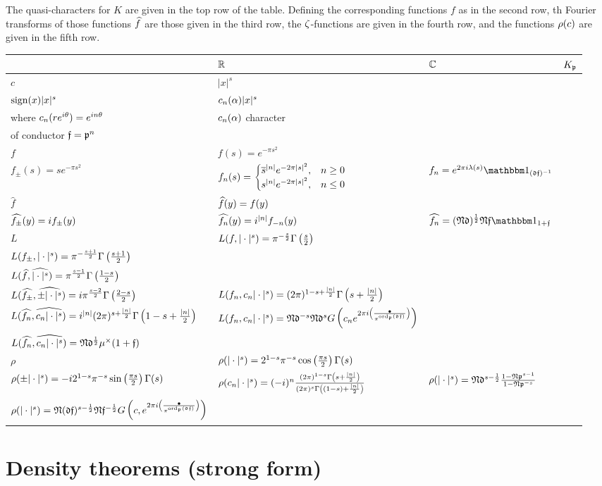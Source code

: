 \begin{thm}
The quasi-characters for $K$ are given in the top row of the table. Defining the corresponding functions $f$ as in the second row, th Fourier transforms of those functions $\widehat{f}$ are those given in the third row, the $\zeta$-functions are given in the fourth row, and the functions $\rho(c)$ are given in the fifth row.\\

\noindent
\begin{tabular}{|l|>{\raggedright}p{1.9in}|>{\raggedright}p{1.8in}|>{\raggedright}p{2.4in}|}
\hline
& $\mathbb{R}$ & $\mathbb{C}$ & $K_{\mathfrak{p}}$ \tabularnewline
\hline
$c$ & $|x|^s$\\ $\operatorname{sign}(x)|x|^s$ & $c_n(\alpha)|x|^s$\\
where $c_n(re^{i\theta})=e^{in\theta}$ & $c_n(\alpha)$ character\\ of conductor $\mathfrak f=\mathfrak{p}^n$\tabularnewline
\hline
$f$ & $f(s)=e^{-\pi s^2}$ \\ $f_{\pm}(s)=se^{-\pi s^2}$ & $f_n(s)=\begin{cases}\overline{s}^{|n|}e^{-2\pi |s|^2},&n\ge 0\\ s^{|n|} e^{-2\pi |s|^2},&n\le 0\end{cases}$ & $f_n=%
e^{2\pi i \la(s)}\one_{(\mfd\mf)^{-1}}$%
\tabularnewline
\hline
$\hat{f}$
&
$\widehat{f}(y)=f(y)$\\
$\widehat{f_{\pm}}(y)=if_{\pm}(y)$ &
$\widehat{f_n}(y)=i^{|n|}f_{-n}(y)$ &
$\wh{f_n}=(\fN \mfd)^{\rc 2}\fN \mf \one_{1+\mf}$\tabularnewline
\hline
$L$&
$L(f,|\cdot|^s)= \pi^{-\frac{s}{2}} \Gamma\left( {\frac{s}{2}} \right)$\\
$L(f_{\pm},|\cdot|^s)=\pi^{-\frac{s+1}{2}} \Gamma\left( {\frac{s+1}{2}} \right)$\\
$L(\widehat{f},\widehat{|\cdot|^s})=\pi^{\frac{s-1}{2}}\Gamma\left( {\frac{1-s}{2}} \right)$\\
$L(\widehat{f_{\pm}}, \widehat{\pm|\cdot|^s})=i\pi^{\frac{s-2}{2}}\Gamma\left( {\frac{2-s}{2}} \right)$
& 
$L(f_n,c_n|\cdot|^s)=(2\pi)^{1-s+\frac{|n|}{2}} \Gamma\left( {s+\frac{|n|}{2}} \right)$\\
$L(\widehat{f_n},\widehat{c_n|\cdot|^s})=i^{|n|}(2\pi)^{s+\frac{|n|}{2}} \Gamma\left( {1-s+\frac{|n|}{2}} \right)$
& 
$L(f_{n},c_n|\cdot|^s)=\mathfrak{N}\mathfrak d^{-s}\mathfrak{N}\mathfrak d^{s}G\left( {c_ne^{2\pi i\left( {\frac{\bullet}{\pi^{\operatorname{ord}_{\mathfrak{p}}(\mathfrak d\mathfrak{f})}}} \right)}} \right)$\\
$L(\widehat{f_n}, \widehat{c_n|\cdot|^s})=\mathfrak{N}\mathfrak d^{\frac{1}{2}}\mu^{\times}(1+\mathfrak{f})$
 \tabularnewline
\hline
$\rho$ &
$\rho(|\cdot|^s)=2^{1-s}\pi^{-s}\cos\left( {\frac{\pi s}{2}} \right) \Gamma(s)$\\
$\rho(\pm|\cdot|^s)=-i2^{1-s}\pi^{-s}\sin\left( {\frac{\pi s}{2}} \right) \Gamma(s)$
 &
$\rho(c_n|\cdot|^s)=(-i)^n\frac{(2\pi)^{1-s}\Gamma\left( {s+\frac{|n|}{2}} \right)}{(2\pi)^s\Gamma\left( {(1-s)+\frac{|n|}{2}} \right)}$ 
 & $\rho(|\cdot|^s) = \mathfrak{N}\mathfrak d^{s-\frac{1}{2}} \frac{1-\mathfrak{N}\mathfrak{p}^{s-1}}{1-\mathfrak{N} \mathfrak{p}^{-s}}$\\
$\rho(|\cdot|^s) = \mathfrak{N}(\mathfrak d\mathfrak{f})^{s-\frac{1}{2}} \mathfrak{N} \mathfrak{f}^{-\frac{1}{2}}G\left( {c,e^{2\pi i\left( {\frac{\bullet}{\pi^{\operatorname{ord}_{\mathfrak{p}}(\mathfrak d\mathfrak{f})}}} \right)}} \right)$
 \tabularnewline
\hline
\end{tabular}
\end{thm}

\section{Density theorems (strong form)}






